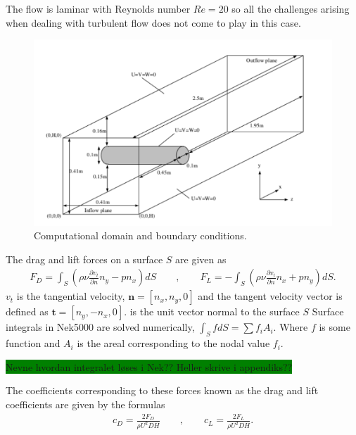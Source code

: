 The flow is laminar with Reynolds number $Re=20$ so all the 
challenges arising when dealing with turbulent flow does not come to play in this case. 
%
\begin{figure}[h]
    \centering
    \includegraphics[width = 1.0\textwidth]{Figures/cylinder.pdf}
    \caption{Computational domain and boundary conditions.}
    \label{fig:cylinder}
\end{figure}
%
The drag and lift forces on a surface $S$ are given as 
%
\begin{align}
    F_D = \int_{S}(\rho \nu \frac{\partial v_t}{\partial n}n_y-pn_x)dS 
    \qquad , \qquad
    F_L = -\int_{S}(\rho \nu \frac{\partial v_t}{\partial n}n_x+pn_y)dS.
    \label{eq:dragnlift}
\end{align}
%
$v_t$ is the tangential velocity, $\mathbf{n}=[n_x,n_y,0]$ and the tangent velocity vector is 
defined as $\mathbf{t} = [n_y,-n_x,0]$.
is the unit vector normal to the surface $S$ 
Surface integrals in Nek5000 are solved numerically, $\int_S f dS = \sum f_i A_i$. Where $f$ is some function and $A_i$ is the areal corresponding
to the nodal value $f_i$. 

\colorbox{green}{Nevne hvordan integralet løses i Nek?? Heller skrive i appendiks??}

The coefficients corresponding to these forces known as the drag and lift coefficients 
are given by the formulas 
\begin{align}
    c_D = \frac{2F_D}{\rho U^2 D H}
    \qquad , \qquad
    c_L = \frac{2F_L}{\rho U^2 D H}.
    \label{eq:dragnliftcoeffs}
\end{align}


